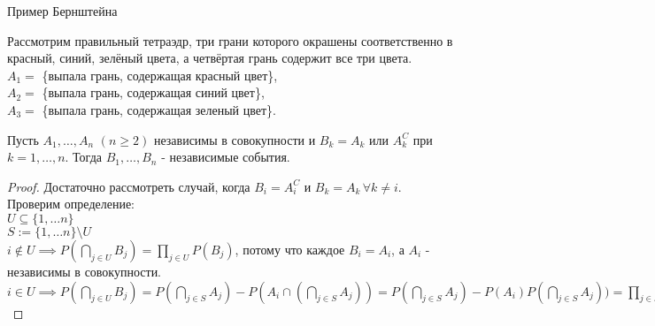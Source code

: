 \begin{example}\label{lect04:ex5}  Пример Бернштейна 
	
	
	Рассмотрим правильный тетраэдр, три грани которого окрашены соответственно в красный, синий, зелёный цвета, а четвёртая грань содержит все три цвета. \\
	$A_1 = $  \{выпала грань, содержащая красный цвет\},\\
	$A_2 = $ \{выпала грань, содержащая синий цвет\},\\
	$A_3 = $ \{выпала грань, содержащая зеленый цвет\}.
	
\end{example}

\begin{lemma}\label{lect04:lemma1}
	Пусть $A_1, \dots, A_n$ $(n \geq 2)$ независимы в совокупности и $B_k = A_k$ или $A_k^C$ при $k = 1, \dots, n$. Тогда $B_1, \dots, B_n$ - независимые события.
\end{lemma}     
\begin{proof}
	Достаточно рассмотреть случай, когда $B_i = A_i^C$ и $B_k = A_k \, \forall k\neq i$. Проверим определение:  \\
	$U \subseteq \{1, \dots n \}$\\
	$S := \{1, \dots n\} \setminus U$\\
	$i \notin U \implies P(\bigcap \limits_{j \in U} B_j) = \prod \limits_{j \in U} P(B_j)$, потому что каждое $B_i = A_i$, а  $A_i$ - независимы в совокупности.\\
	$i \in U \implies P(\bigcap \limits_{j \in U} B_j) = P(\bigcap \limits_{j \in S} A_j) - P(A_i \cap (\bigcap \limits_{j \in S} A_j)) = P(\bigcap \limits_{j \in S} A_j) - P(A_i)P(\bigcap \limits_{j \in S} A_j)) = \prod \limits_{j \in S}P(A_j) - P(A_i) \prod \limits_{j \in S} P(A_j) = (1- P(A_i))\prod \limits_{j \in S} P(A_j) = P(A_i^C)\prod \limits_{j \in S} P(A_j) = \prod \limits_{j \in U} P(B_j)$
\end{proof}

